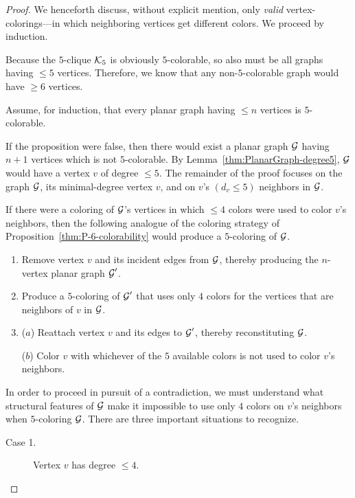 \begin{proof}
We henceforth discuss, without explicit mention, only {\em valid} vertex-colorings---in which neighboring vertices get different colors.  We proceed by induction.

\medskip

Because the $5$-clique $\mbox{$\cal K$}_5$ is obviously $5$-colorable, so also must be all graphs having $\leq 5$ vertices.  Therefore, we know that any non-$5$-colorable graph would have $\geq 6$ vertices.

\medskip

Assume, for induction, that every planar graph having $\leq n$ vertices is $5$-colorable.

\medskip

If the proposition were false, then there would exist a planar graph $\mbox{$\cal G$}$ having $n+1$ vertices which is not $5$-colorable.  By Lemma~\ref{thm:PlanarGraph-degree5}, $\mbox{$\cal G$}$ would have a vertex $v$ of degree $\leq 5$.  The remainder of the proof focuses on the graph $\mbox{$\cal G$}$, its minimal-degree vertex $v$, and on $v$'s $(d_v \leq 5)$ neighbors in $\mbox{$\cal G$}$.

\smallskip

If there were a coloring of $\mbox{$\cal G$}$'s vertices in which $\leq 4$ colors were used to color $v$'s neighbors, then the following analogue of the coloring strategy of Proposition~\ref{thm:P-6-colorability} would produce a $5$-coloring of $\mbox{$\cal G$}$.
\begin{enumerate}
\item
Remove vertex $v$ and its incident edges from $\mbox{$\cal G$}$, thereby producing the $n$-vertex planar graph $\mbox{$\cal G$}'$.
\item
Produce a $5$-coloring of $\mbox{$\cal G$}'$ that uses only $4$ colors for the vertices that are neighbors of $v$ in $\mbox{$\cal G$}$.
\item
($a$) Reattach vertex $v$ and its edges to $\mbox{$\cal G$}'$, thereby reconstituting $\mbox{$\cal G$}$.

\smallskip

($b$) Color $v$ with whichever of the $5$ available colors is not used to color $v$'s neighbors.
\end{enumerate}

\smallskip

In order to proceed in pursuit of a contradiction, we must understand what structural features of $\mbox{$\cal G$}$ make it impossible to use only $4$ colors on $v$'s neighbors when $5$-coloring $\mbox{$\cal G$}$.  There are three important situations to recognize.
\begin{description}
\item[{\sf Case 1}.]
Vertex $v$ has degree $\leq 4$.


\end{description}
\end{proof}
